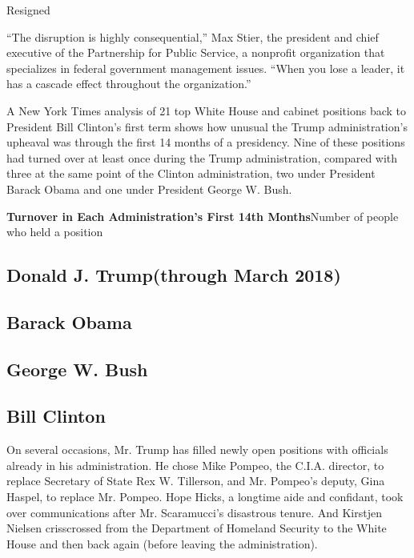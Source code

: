 Resigned

``The disruption is highly consequential,'' Max Stier, the president and
chief executive of the Partnership for Public Service, a nonprofit
organization that specializes in federal government management issues.
``When you lose a leader, it has a cascade effect throughout the
organization.''

A New York Times analysis of 21 top White House and cabinet positions
back to President Bill Clinton's first term shows how unusual the Trump
administration's upheaval was through the first 14 months of a
presidency. Nine of these positions had turned over at least once during
the Trump administration, compared with three at the same point of the
Clinton administration, two under President Barack Obama and one under
President George W. Bush.

\textbf{Turnover in Each Administration's First 14th Months}Number of
people who held a position

\hypertarget{donald-j-trumpthrough-march-2018}{%
\subsection{Donald J. Trump(through March
2018)}\label{donald-j-trumpthrough-march-2018}}

\hypertarget{barack-obama}{%
\subsection{Barack Obama}\label{barack-obama}}

\hypertarget{george-w-bush}{%
\subsection{George W. Bush}\label{george-w-bush}}

\hypertarget{bill-clinton}{%
\subsection{Bill Clinton}\label{bill-clinton}}

On several occasions, Mr. Trump has filled newly open positions with
officials already in his administration. He chose Mike Pompeo, the
C.I.A. director, to replace Secretary of State Rex W. Tillerson, and Mr.
Pompeo's deputy, Gina Haspel, to replace Mr. Pompeo. Hope Hicks, a
longtime aide and confidant, took over communications after Mr.
Scaramucci's disastrous tenure. And Kirstjen Nielsen crisscrossed from
the Department of Homeland Security to the White House and then back
again (before leaving the administration).

